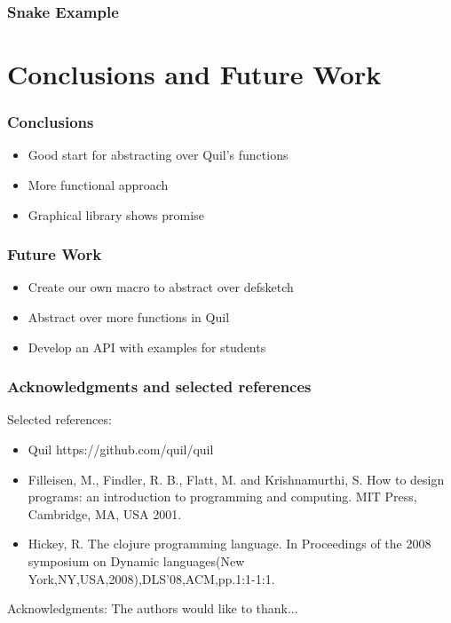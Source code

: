 \documentclass{beamer}
\begin{document}
\begin{frame}
\frametitle{Snake Example}
\begin{center}
\end{center}
\end{frame}


\section{Conclusions and Future Work}

\begin{frame}
\frametitle{Conclusions}
\begin{itemize}
\item Good start for abstracting over Quil's functions
\item More functional approach
\item Graphical library shows promise
\end{itemize}
\end{frame}

\begin{frame}
\frametitle{Future Work}
\begin{itemize}
\item Create our own macro to abstract over defsketch
\item Abstract over more functions in Quil
\item Develop an API with examples for students
\end{itemize}
\end{frame}

\begin{frame}
\frametitle{Acknowledgments and selected references}
Selected references:
\begin{itemize}
\item Quil https://github.com/quil/quil
\item Filleisen, M., Findler, R. B., Flatt, M. and Krishnamurthi, S. How to design programs: an introduction to programming and computing. MIT Press, Cambridge, MA, USA 2001.
\item Hickey, R. The clojure programming language. In Proceedings of the 2008 symposium on Dynamic languages(New York,NY,USA,2008),DLS'08,ACM,pp.1:1-1:1.
\end{itemize}
Acknowledgments:
The authors would like to thank...
\end{frame}
\end{document}
